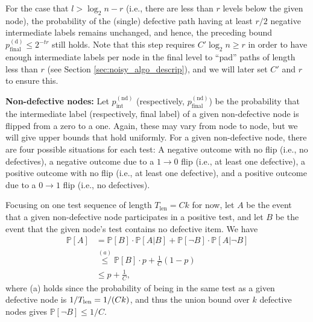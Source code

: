For the case that $l>\log_2n-r$ (i.e., there are less than $r$ levels below the given node), the probability of the (single) defective path having at least $r/2$ negative intermediate labels remains unchanged, and hence, the preceding bound $p_{\text{final}}^{(\text{d})}\leq2^{-tr}$ still holds. Note that this step requires $C'\log_2n\geq r$ in order to have enough intermediate labels per node in the final level to ``pad'' paths of length less than $r$ (see Section \ref{sec:noisy_algo_descrip}), and we will later set $C'$ and $r$ to ensure  this.

\textbf{Non-defective nodes:} Let $p_{\text{int}}^{(\text{nd})}$ (respectively, $p_{\text{final}}^{(\text{nd})}$) be the probability that the intermediate label (respectively, final label) of a given non-defective node is flipped from a zero to a one. Again, these may vary from node to node, but we will give upper bounds that hold uniformly. For a given non-defective node, there are four possible situations for each test: A negative outcome with no flip (i.e., no defectives), a negative outcome due to a $1\rightarrow0$ flip (i.e., at least one defective), a positive outcome with no flip (i.e., at least one defective), and a positive outcome due to a $0\rightarrow1$ flip (i.e., no defectives).

Focusing on one test sequence of length $T_{\text{len}} = Ck$ for now, let $A$ be the event that a given non-defective node participates in a positive test, and let $B$ be the event that the given node's test contains no defective item. We have
\begin{align}
    \mathbb{P}[A]
    &=\mathbb{P}[B]\cdot\mathbb{P}[A|B]+\mathbb{P}[\neg B]\cdot\mathbb{P}[A|\neg B] \\
    &\stackrel{(a)}{\leq}\mathbb{P}[B]\cdot p+\frac{1}{C}(1-p) \\
    &\leq p+\frac{1}{C}, \label{eq:upperbound_of_P[A]}
\end{align}
where (a) holds since the probability of being in the same test as a given defective node is $1/T_{\rm len} = 1/(Ck)$, and thus the union bound over $k$ defective nodes gives $\mathbb{P}[\neg B] \le 1/C$.

